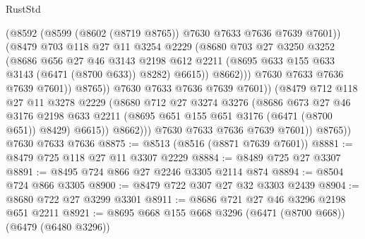 \begin{lexlean}{RustStd}
\begin{coremodule}
{\begin{coremodule}
{{{{{{{{{{{{{{{{{{{{{{{{{{                                (@8592 (@8599 (@8602 (@8719 @8765)) @7630 @7633 @7636 @7639 @7601))
                                (@8479
                                  @703
                                  @118
                                  @27
                                  @11
                                  @3254
                                  @2229
                                  (@8680
                                    @703
                                    @27
                                    @3250
                                    @3252
                                    (@8686
                                      @656
                                      @27
                                      @46
                                      @3143
                                      @2198
                                      @612
                                      @2211
                                      (@8695 @633 @155 @633 @3143 (@6471 (@8700 @633)) @8282)
                                      @6615))
                                  @8662)))
                            @7630
                            @7633
                            @7636
                            @7639
                            @7601))
                        @8765))
                    @7630
                    @7633
                    @7636
                    @7639
                    @7601))
                (@8479
                  @712
                  @118
                  @27
                  @11
                  @3278
                  @2229
                  (@8680
                    @712
                    @27
                    @3274
                    @3276
                    (@8686
                      @673
                      @27
                      @46
                      @3176
                      @2198
                      @633
                      @2211
                      (@8695 @651 @155 @651 @3176 (@6471 (@8700 @651)) @8429)
                      @6615))
                  @8662)))
            @7630
            @7633
            @7636
            @7639
            @7601))
        @8765))
    @7630
    @7633
    @7636
@8875 := @8513 (@8516 (@8871 @7639 @7601))
@8881 := @8479 @725 @118 @27 @11 @3307 @2229
@8884 := @8489 @725 @27 @3307
@8891 := @8495 @724 @866 @27 @2246 @3305 @2114 @874
@8894 := @8504 @724 @866 @3305
@8900 := @8479 @722 @307 @27 @32 @3303 @2439
@8904 := @8680 @722 @27 @3299 @3301
@8911 := @8686 @721 @27 @46 @3296 @2198 @651 @2211
@8921 := @8695 @668 @155 @668 @3296 (@6471 (@8700 @668)) (@6479 (@6480 @3296))
}}}}}}}}}}}}}}}}}}}}}}}}}}
\end{coremodule}}
\end{coremodule}
\end{lexlean}
